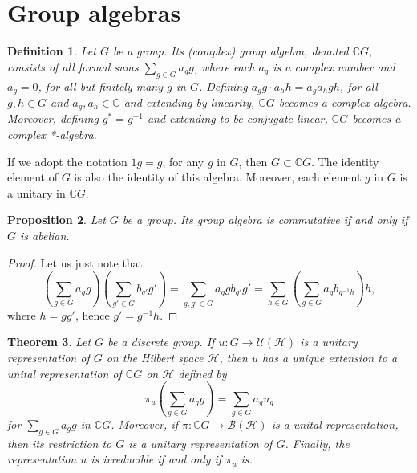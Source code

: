\documentclass{book}
\newtheorem{definition}{Definition}[section]
\newtheorem{proposition}[definition]{Proposition}
\newtheorem{theorem}[definition]{Theorem}
\begin{document}
\section{Group algebras}
\begin{definition}
  Let \(G\) be a group. Its (complex) \textnormal{group algebra}, denoted
  \(\mathbb{C}G\), consists of all formal sums \(\sum_{g\in G} a_g g\), where each \(a_g\) is a complex number
  and \(a_g = 0\), for all but finitely many \(g\) in \(G\). Defining \(a_g g \cdot a_h h = a_g a_h gh\),
  for all \(g,h \in G\) and \(a_g,a_h \in \mathbb{C}\) and extending by linearity, \(\mathbb{C}G\) becomes a
  complex algebra. Moreover, defining \(g^* = g^{-1}\) and extending to be conjugate
  linear, \(\mathbb{C}G\) becomes a complex *-algebra.
\end{definition}
If we adopt the notation \(1g = g\), for any \(g\) in \(G\), then \(G \subset \mathbb{C}G\). The
identity element of \(G\) is also the identity of this algebra. Moreover, each
element \(g\) in \(G\) is a unitary in \(\mathbb{C}G\).
\begin{proposition}\label{prop:222}
  Let \(G\) be a group. Its group algebra is commutative if
  and only if \(G\) is abelian.
\end{proposition}
\begin{proof}
  Let us just note that
  \[
  \left(\sum_{g\in G}a_g g \right)\left( \sum_{g'\in G}b_{g'} g'\right) = \sum_{g,g'\in G} a_g g b_{g'} g' 
  = \sum_{h\in G}\left( \sum_{g\in G}a_g b_{g^{-1}h} \right)h,
  \]
  where \(h=gg'\), hence \(g'=g^{-1}h\).
\end{proof}
\begin{theorem}\label{theorem:223}
  Let \(G\) be a discrete group. If \(u : G \rightarrow \mathcal{U}(\mathcal{H})\) is a unitary
  representation of \(G\) on the Hilbert space \(\mathcal{H}\), then \(u\) has a unique extension to
  a unital representation of \(\mathbb{C}G\) on \(\mathcal{H}\) defined by
  \[
  \pi_u\left(\sum_{g\in G}a_g g \right)=\sum_{g\in G}a_g u_g
  \]
  for \(\sum_{g\in G}a_g g\) in \(\mathbb{C}G\). Moreover, if \(\pi : \mathbb{C}G \rightarrow \mathcal{B}(\mathcal{H})\) is a unital 
  representation, then its restriction to \(G\) is a unitary representation of \(G\). Finally, the
  representation \(u\) is irreducible if and only if \(\pi_u\) is.
\end{theorem}
\end{document}
